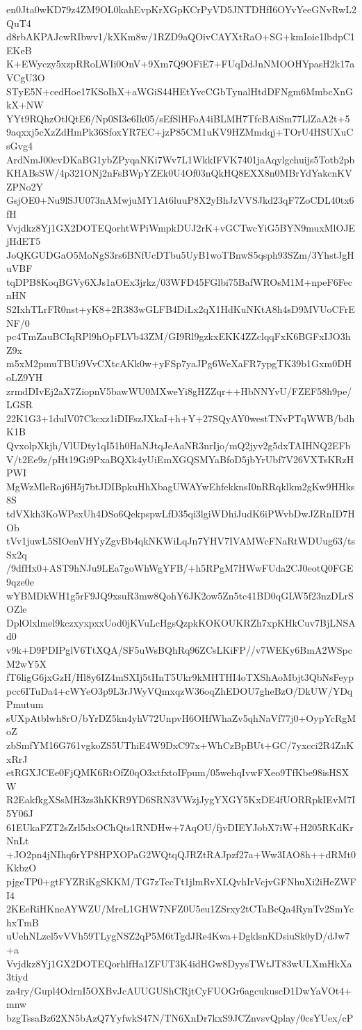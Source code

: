 en0Jta0wKD79z4ZM9OL0kahEvpKrXGpKCrPyVD5JNTDHfI6OYvYeeGNvRwL2QuT4
d8rbAKPAJcwRIbwv1/kXKm8w/1RZD9aQOivCAYXtRaO+SG+kmIoie1lbdpC1EKeB
K+EWyczy5xzpRRoLWIi0OnV+9Xm7Q9OFiE7+FUqDdJnNMOOHYpasH2k17aVCgU3O
STyE5N+cedHoe17KSoIhX+aWGiS44HEtYvcCGbTynalHtdDFNgm6MmbcXnGkX+NW
YYt9RQhzOtlQtE6/Np0SI3e6Ik05/sEfSlHFoA4iBLMH7TfcBAiSm77LlZaA2t+5
9aqxxj5cXzZdHmPk36SfoxYR7EC+jzP85CM1uKV9HZMmdqj+TOrU4HSUXuCsGvg4
ArdNmJ00cvDKaBG1ybZPyqaNKi7Wv7L1WkkIFVK7401jaAqylgchuijs5Totb2pb
KHABsSW/4p321ONj2nFsBWpYZEk0U4Of03nQkHQ8EXX8n0MBrYdYakcnKVZPNo2Y
GsjOE0+Nu9lSJU073nAMwjuMY1At6luuP8X2yBhJzVVSJkd23qF7ZoCDL40tx6fH
Vvjdkz8Yj1GX2DOTEQorhtWPiWmpkDUJ2rK+vGCTwcYiG5BYN9muxMlOJEjHdET5
JoQKGUDGaO5MoNgS3rs6BNfUcDTbu5UyB1woTBnwS5qsph93SZm/3YhstJgHuVBF
tqDPB8KoqBGVy6XJs1aOEx3jrkz/03WFD45FGlbi75BafWROsM1M+npeF6FecnHN
S2IxhTLrFR0nst+yK8+2R383wGLFB4DiLx2qX1HdKuNKtA8h4sD9MVUoCFrENF/0
pc4TmZauBCIqRPl9hOpFLVb43ZM/GI9Rl9gzkxEKK4ZZclqqFxK6BGFxIJO3hZ9x
m5xM2pmuTBUi9VvCXtcAKk0w+yFSp7yaJPg6WeXaFR7ypgTK39b1Gxm0DHoLZ9YH
zrmdDIvEj2aX7ZiopnV5bawWU0MXweYi8gHZZqr++HbNNYvU/FZEF58h9pe/LGSR
22K1G3+1dulV07Ckcxz1iDIFszJXkaI+h+Y+27SQyAY0westTNvPTqWWB/bdhK1B
QvxolpXkjh/VlUDty1qI51h0HaNJtqJeAaNR3nrIjo/mQ2jyv2g5dxTAIHNQ2EFb
V/t2Ee9z/pHt19Gi9PxaBQXk4yUiEmXGQSMYaBfoD5jbYrUbf7V26VXTsKRzHPWI
MgWzMleRoj6H5j7btJDIBpkuHhXbagUWAYwEhfekknsI0nRRqklkm2gKw9HHks8S
tdVXkh3KoWPsxUh4DSo6QekpspwLfD35qi3lgiWDhiJudK6iPWvbDwJZRnID7HOb
tVv1juwL5SIOenVHYyZgvBb4qkNKWiLqJn7YHV7IVAMWcFNaRtWDUug63/tsSx2q
/9dfHx0+AST9hNJu9LEa7goWhWgYFB/+h5RPgM7HWwFUda2CJ0eotQ0FGE9qze0e
wYBMDkWH1g5rF9JQ9xsuR3mw8QohY6JK2ow5Zn5tc41BD0qGLW5f23nzDLrSOZle
DplOlxlmel9kczxyxpxxUod0jKVuLcHgsQzpkKOKOUKRZh7xpKHkCuv7BjLNSAd0
v9k+D9PDIPglV6TtXQA/SF5uWsBQhRq96ZCsLKiFP//v7WEKy6BmA2WSpcM2wY5X
fT6ligG6jxGzH/Hl8y6IZ4mSXIj5tHnT5Ukr9kMHTHI4oTXShAoMbjt3QbNsFeyp
pcc6ITuDa4+cWYeO3p9L3rJWyVQmxqzW36oqZhEDOU7gheBzO/DkUW/YDqPmutum
sUXpAtblwh8rO/bYrDZ5kn4yhV72UnpvH6OHfWhaZv5qhNaVf77j0+OypYcRgMoZ
zbSmfYM16G761vgkoZS5UThiE4W9DxC97x+WhCzBpBUt+GC/7yxcci2R4ZnKxRrJ
etRGXJCEe0FjQMK6RtOfZ0qO3xtfxtoIFpum/05wehqIvwFXeo9TfKbe98isHSXW
R2EakfkgXSsMH3zs3hKKR9YD6SRN3VWzjJygYXGY5KxDE4fUORRpkIEvM7I5Y06J
61EUkaFZT2sZrl5dxOChQts1RNDHw+7AqOU/fjvDIEYJobX7iW+H205RKdKrNnLt
+JO2pn4jNIhq6rYP8HPXOPaG2WQtqQJRZtRAJpzf27a+Ww3IAO8h++dRMt0KkbzO
pjgeTP0+gtFYZRiKgSKKM/TG7zTccTt1jlmRvXLQvhIrVcjvGFNhuXi2iHeZWFI4
2KEeRiHKneAYWZU/MreL1GHW7NFZ0U5eu1ZSrxy2tCTaBcQa4RynTv2SmYchxTmB
uUehNLzel5vVVh59TLygNSZ2qP5M6tTgdJRe4Kwa+DgklsnKDsiuSk0yD/dJw7+a
Vvjdkz8Yj1GX2DOTEQorhlfHa1ZFUT3K4idHGw8DyysTWtJT83wULXmHkXa3tiyd
za4ry/Gupl4OdrnI5OXBvJcAUUGUShCRjtCyFUOGr6agcukuscD1DwYaVOt4+mnw
bzgTssaBz62XN5bAzQ7YyfwkS47N/TN6XnDr7kxS9JCZnvsvQplay/0csYUex/cP
